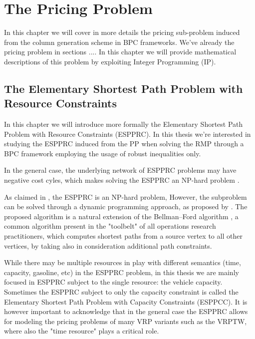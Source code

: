 \chapter{The Pricing Problem}
\label{sec:the-pricing-problem}


In this chapter we will cover in more details the pricing sub-problem
induced from the column generation scheme in BPC frameworks.
We've already the pricing problem in sections ....
In this chapter we will provide mathematical descriptions
of this problem by exploiting Integer Programming (IP).

\section{The Elementary Shortest Path Problem with Resource Constraints}
\label{sec:the-elementary-shortest-path-problem-with-resource-constraints}


In this chapter we will introduce more formally the Elementary Shortest Path Problem with Resource Constraints (ESPPRC).
In this thesis we're interested in studying the ESPPRC induced from the PP when solving the RMP through a BPC framework employing the usage of robust inequalities only.

In the general case, the underlying network of ESPPRC problems may have negative cost cyles, which makes solving the ESPPRC an NP-hard problem \parencite{dror1994}.

As claimed in \textcite{dror1994}, the ESPPRC is an NP-hard problem,
However, the subproblem can be solved through a dynamic programming approach, as proposed by \textcite{feillet2004}.
The proposed algorithm is a natural extension of the Bellman–Ford algorithm \parencite{bellman1958, fordjr1956},
a common algorithm present in the "toolbelt" of all operations research practitioners,
which computes shortest paths from a source vertex to all other vertices,
by taking also in consideration additional path constraints.

While there may be multiple resources in play with different semantics
(time, capacity, gasoline, etc)
in the ESPPRC problem,
in this thesis we are mainly focused in ESPPRC subject to the single resource: the vehicle capacity.
Sometimes the ESPPRC subject to only the capacity constraint is called the Elementary Shortest
Path Problem with Capacity Constraints (ESPPCC).
It is however important to acknowledge that in the general case the ESPPRC allows for modeling
the pricing problems of many VRP variants such as the VRPTW, where also the "time resource"
plays a critical role.

